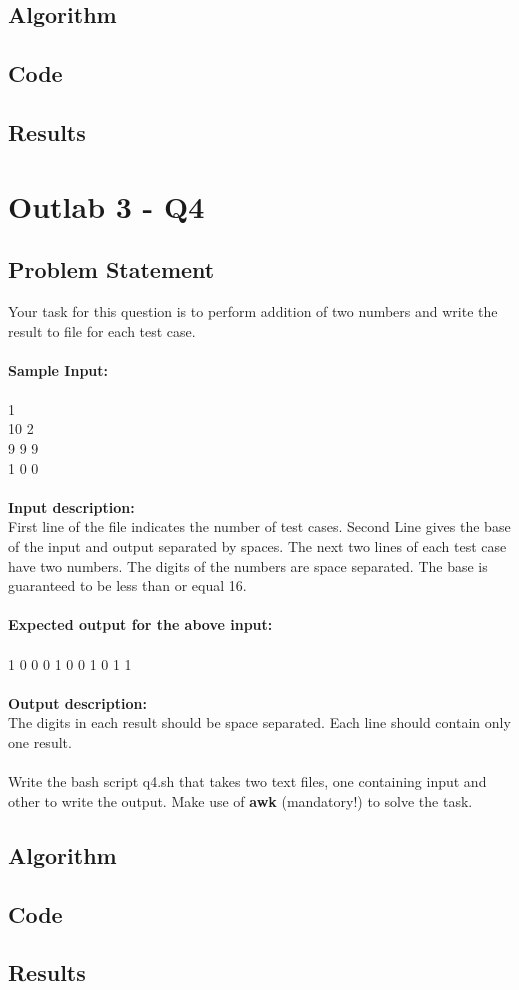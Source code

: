 \documentclass[12pt]{article}
\begin{document}
\subsection{Algorithm}

\subsection{Code}

\subsection{Results}
\newpage

\section{Outlab 3 - Q4}

\subsection{Problem Statement}
Your task for this question is to perform addition of two numbers and 
write the result to file for each test case.\\\\
\textbf{Sample Input:}\\\\
1
\\
10 2
\\
9 9 9
\\
1 0 0
\\
\\
\textbf{Input description:}
\\
First line of the file indicates the number of test cases.
Second Line gives the base of the input and output separated by spaces. 
The next two lines of each test case have two numbers. 
The digits of the numbers are space separated. 
The base is guaranteed to be less than or equal 16.
\\\\
\textbf{Expected output for the above input:}
\\\\
1 0 0 0 1 0 0 1 0 1 1
\\\\
\textbf{Output description:}
\\
The digits in each result should be space separated. 
Each line should contain only one result.\\\\
Write the bash script q4.sh that takes two text files, one containing input and 
other to write the output. 
Make use of \textbf{awk} (mandatory!) to solve the task.
\subsection{Algorithm}

\subsection{Code}

\subsection{Results}
\newpage

\printbibliography
\end{document}

